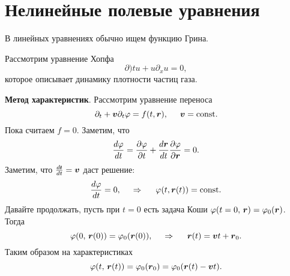 \section{Нелинейные полевые уравнения}

В линейных уравнениях обычно ищем функцию Грина.

Рассмотрим уравнение Хопфа
\begin{equation*}
    \partial)t u + u \partial_x u = 0,
\end{equation*}
которое описывает динамику плотности частиц газа.

\textbf{Метод характеристик}. 
Рассмотрим уравнение переноса
\begin{equation*}
    \partial_t  + \mbox{\boldmath $v$} \partial_t \varphi = f(t, \mbox{\boldmath $r$}), 
    \hspace{5 mm} 
    \mbox{\boldmath $v$} = \textnormal{const}.
\end{equation*}
Пока считаем $f = 0$. Заметим, что
\begin{equation*}
    \frac{d \varphi}{d t} = \frac{\partial \varphi}{\partial t}  + \frac{d \mbox{\boldmath $r$}}{d t} \frac{\partial \varphi}{\partial \mbox{\boldmath $r$}} = 0.
\end{equation*}
Заметим, что $\frac{d \smallvc{t}}{d t} = \vc{v}$ даст решение:
\begin{equation*}
    \frac{d \varphi}{d t} =0,
    \hspace{0.5cm} \Rightarrow \hspace{0.5cm}   
    \varphi(t, \mbox{\boldmath $r$}(t)) = \textnormal{const}.
\end{equation*}
Давайте продолжать, пусть при $t=0$ есть задача Коши $\varphi(t=0,\, \mbox{\boldmath $r$}) = \varphi_0(\mbox{\boldmath $r$})$. Тогда
\begin{equation*}
    \varphi(0,\, \mbox{\boldmath $r$}(0)) = \varphi_0 (\mbox{\boldmath $r$}(0)),
    \hspace{0.5cm} \Rightarrow \hspace{0.5cm}
    \mbox{\boldmath $r$}(t) = \mbox{\boldmath $v$} t + \mbox{\boldmath $r$}_0.
\end{equation*}
Таким образом на характеристиках
\begin{equation*}
    \varphi(t,\, \mbox{\boldmath $r$}(t)) = \varphi_0 (\mbox{\boldmath $r$}_0) = \varphi_0(\mbox{\boldmath $r$}(t)-\mbox{\boldmath $v$} t).
\end{equation*}
% 


